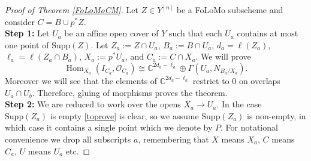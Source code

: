 \documentclass{amsart}
\theoremstyle{definition}
\newcommand{\CC} {\mathbb{C}}          %
\renewcommand{\O}{\mathcal{O}}
\newcommand{\Supp}{\mathrm{Supp}}
\newcommand{\Hom}{\operatorname{Hom}}
\begin{document}
\begin{proof}[Proof of Theorem \ref{FoLoMoCM}]
Let $Z \in Y^{[n]}$ be a FoLoMo subscheme and consider $C = B \cup p^*Z$. \\

\noindent \textbf{Step 1:} Let $U_a$ be an affine open cover of $Y$ such that each $U_a$ contains at most one point of $\Supp(Z)$. Let $Z_a := Z \cap U_a$, $B_a := B \cap U_a$, $d_a = \ell(Z_a)$, $\ell_a = \ell(Z_a \cap B_a)$, $X_a := p^* U_a$, and $C_a := C \cap X_a$. We will prove
\begin{equation} \label{toprove}
\Hom_{X_a}(I_{C_a}, \O_{C_a}) \cong \CC^{2d_a - \ell_a} \oplus \Gamma(U_a,N_{B_a/X_a}).
\end{equation}
Moreover we will see that the elements of $\CC^{2d_a - \ell_a}$ restrict to 0 on overlaps $U_a \cap U_b$. Therefore, gluing of morphisms proves the theorem. \\

\noindent \textbf{Step 2:} We are reduced to work over the opens $X_a \rightarrow U_a$. In the case $\Supp(Z_a)$ is empty \eqref{toprove} is clear, so we assume $\Supp(Z_a)$ is non-empty, in which case it contains a single point which we denote by $P$. For notational convenience we drop all subscripts $a$, remembering that $X$ means $X_a$, $C$ means $C_a$, $U$ means $U_a$ etc. 


\end{proof}
\end{document}
